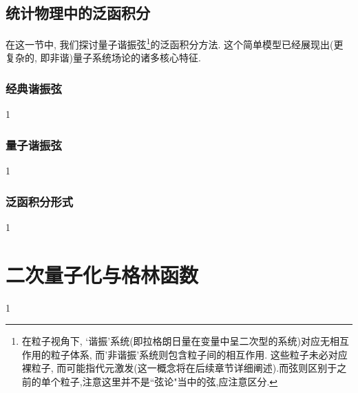 \subsection{统计物理中的泛函积分}
在这一节中, 我们探讨量子谐振弦\footnote{在粒子视角下, `谐振'系统(即拉格朗日量在变量中呈二次型的系统)对应无相互作用的粒子体系, 而'非谐振'系统则包含粒子间的相互作用. 这些粒子未必对应裸粒子, 而可能指代元激发(这一概念将在后续章节详细阐述).而弦则区别于之前的单个粒子,注意这里并不是``弦论"当中的弦,应注意区分.}的泛函积分方法. 这个简单模型已经展现出(更复杂的, 即非谐)量子系统场论的诸多核心特征. 
\subsubsection{经典谐振弦}
1
\subsubsection{量子谐振弦}
1
\subsubsection{泛函积分形式}
1
\section{二次量子化与格林函数}
1


















































	
\ifx\allfiles\undefined

	\else
	\fi
